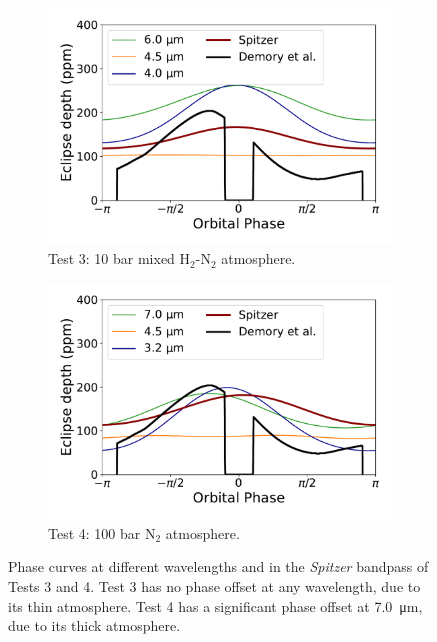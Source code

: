 \begin{figure}
  \centering
  \begin{subfigure}[t]{0.48\textwidth}
    \includegraphics[width=\textwidth]{figures/soc-lava-planets/h2n2-spec-pc.pdf}
    \caption{Test 3: 10 bar mixed H$_{2}$-N$_{2}$ atmosphere.}\label{fig:soc-spec-pc-h2n2}
  \end{subfigure}
\quad
  \begin{subfigure}[t]{0.48\textwidth}
    \includegraphics[width=\textwidth]{figures/soc-lava-planets/n2-100bar-spec-pc.pdf}
    \caption{Test 4: 100 bar N$_{2}$ atmosphere.}\label{fig:soc-spec-pc-n2-100bar}
  \end{subfigure}
  \caption{Phase curves at different wavelengths and in the \textit{Spitzer} bandpass of Tests 3 and 4. Test 3 has no phase offset at any wavelength, due to its thin atmosphere. Test 4 has a significant phase offset at \SI{7.0}{\micro\metre}, due to its thick atmosphere.}
  \label{fig:soc-spec-pc-best}
\end{figure}


